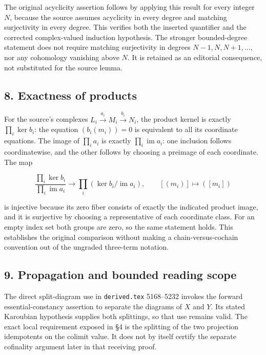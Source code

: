 The original acyclicity assertion follows by applying this result for every integer \(N\), because the source assumes acyclicity in every degree and matching surjectivity in every degree. This verifies both the inserted quantifier and the corrected complex-valued induction hypothesis. The stronger bounded-degree statement does not require matching surjectivity in degrees \(N-1,N,N+1,\ldots\), nor any cohomology vanishing above \(N\). It is retained as an editorial consequence, not substituted for the source lemma.

\subsection{8. Exactness of products}\label{note-09-exactness-of-products}

For the source's complexes \(L_i\xrightarrow{a_i}M_i\xrightarrow{b_i}N_i\), the product kernel is exactly \(\prod_i\ker b_i\): the equation \((b_i(m_i))=0\) is equivalent to all its coordinate equations. The image of \(\prod_i a_i\) is exactly \(\prod_i\operatorname{im}a_i\): one inclusion follows coordinatewise, and the other follows by choosing a preimage of each coordinate. The map

\[
\frac{\prod_i\ker b_i}{\prod_i\operatorname{im}a_i}
\longrightarrow \prod_i(\ker b_i/\operatorname{im}a_i),
\qquad [(m_i)]\longmapsto([m_i])
\]

is injective because its zero fiber consists of exactly the indicated product image, and it is surjective by choosing a representative of each coordinate class. For an empty index set both groups are zero, so the same statement holds. This establishes the original comparison without making a chain-versus-cochain convention out of the ungraded three-term notation.

\subsection{9. Propagation and bounded reading scope}\label{note-09-propagation-and-bounded-reading-scope}

The direct split-diagram use in \texttt{derived.tex} 5168--5232 invokes the forward essential-constancy assertion to separate the diagrams of \(X\) and \(Y\). Its stated Karoubian hypothesis supplies both splittings, so that use remains valid. The exact local requirement exposed in §4 is the splitting of the two projection idempotents on the colimit value. It does not by itself certify the separate cofinality argument later in that receiving proof.

